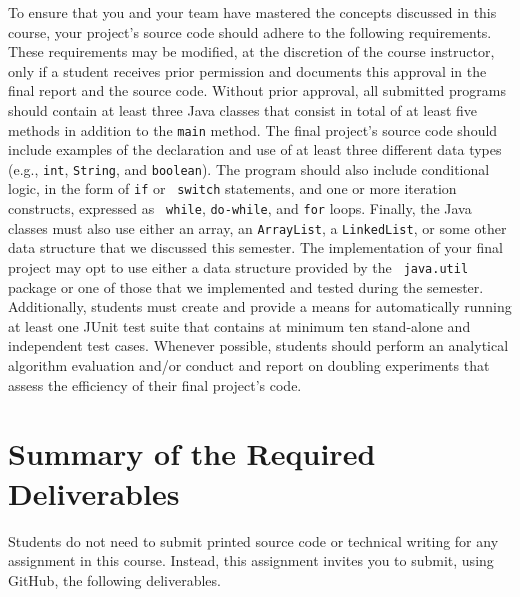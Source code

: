 \documentclass[11pt]{article}
\begin{document}
To ensure that you and your team have mastered the concepts discussed in this
course, your project's source code should adhere to the following requirements.
These requirements may be modified, at the discretion of the course instructor,
only if a student receives prior permission and documents this approval in the
final report and the source code. Without prior approval, all submitted programs
should contain at least three Java classes that consist in total of at least
five methods in addition to the {\tt main} method. The final project's source
code should include examples of the declaration and use of at least three
different data types (e.g., {\tt int}, {\tt String}, and {\tt boolean}). The
program should also include conditional logic, in the form of {\tt if} or {\tt
switch} statements, and one or more iteration constructs, expressed as {\tt
while}, {\tt do-while}, and {\tt for} loops. Finally, the Java classes must
also use either an array, an {\tt ArrayList}, a {\tt LinkedList}, or some
other data structure that we discussed this semester. The implementation of
your final project may opt to use either a data structure provided by the {\tt
java.util} package or one of those that we implemented and tested during the
semester. Additionally, students must create and provide a means for
automatically running at least one JUnit test suite that contains at minimum
ten stand-alone and independent test cases. Whenever possible, students should
perform an analytical algorithm evaluation and/or conduct and report on
doubling experiments that assess the efficiency of their final project's code.

\section*{Summary of the Required Deliverables}

\noindent Students do not need to submit printed source code or technical
writing for any assignment in this course. Instead, this assignment invites you
to submit, using GitHub, the following deliverables.
\end{document}
